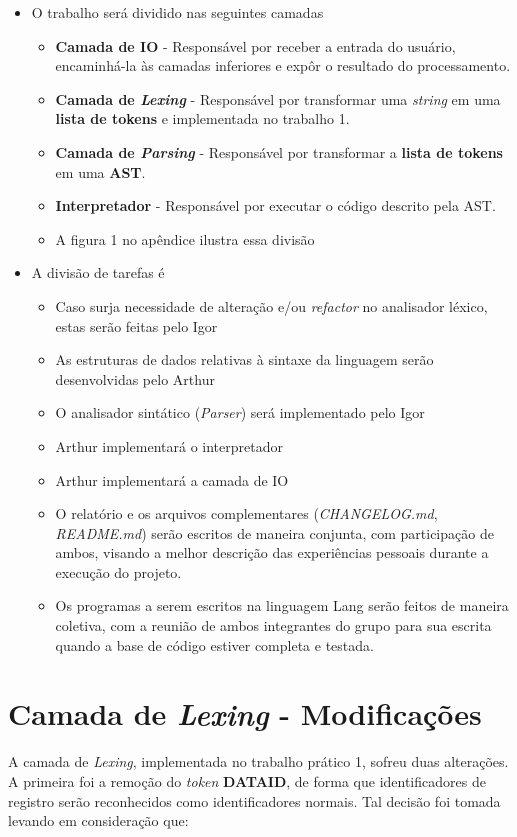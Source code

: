 \documentclass{article}
\begin{document}
\begin{itemize}
    \item O trabalho será dividido nas seguintes camadas
    \begin{itemize}
        \item \textbf{Camada de IO} - Responsável por receber a entrada do usuário, encaminhá-la às camadas inferiores e expôr o resultado do processamento.
        \item \textbf{Camada de \textit{Lexing}} - Responsável por transformar uma \textit{string} em uma \textbf{lista de tokens} e implementada no trabalho 1.
        \item \textbf{Camada de \textit{Parsing}} - Responsável por transformar a \textbf{lista de tokens} em uma \textbf{AST}.
        \item \textbf{\textbf{Interpretador}} - Responsável por executar o código descrito pela AST.
        \item A figura 1 no apêndice ilustra essa divisão
    \end{itemize}

    \item A divisão de tarefas é
    \begin{itemize}
        \item Caso surja necessidade de alteração e/ou \textit{refactor} no analisador léxico, estas serão feitas pelo Igor
        \item As estruturas de dados relativas à sintaxe da linguagem serão desenvolvidas pelo Arthur
        \item O analisador sintático (\textit{Parser}) será implementado pelo Igor
        \item Arthur implementará o interpretador
        \item Arthur implementará a camada de IO
        \item O relatório e os arquivos complementares (\textit{CHANGELOG.md}, \textit{README.md}) serão escritos de maneira conjunta, com participação de ambos, visando a melhor descrição das experiências pessoais durante a execução do projeto.
        \item Os programas a serem escritos na linguagem Lang serão feitos de maneira coletiva, com a reunião de ambos integrantes do grupo para sua escrita quando a base de código estiver completa e testada.
    \end{itemize}
\end{itemize}

\section{Camada de \textit{Lexing} - Modificações}
A camada de \textit{Lexing}, implementada no trabalho prático 1, sofreu duas alterações. A primeira foi a remoção do \textit{token} \textbf{DATAID}, de forma que identificadores de registro serão reconhecidos como identificadores normais. Tal decisão foi tomada levando em consideração que:
\end{document}
